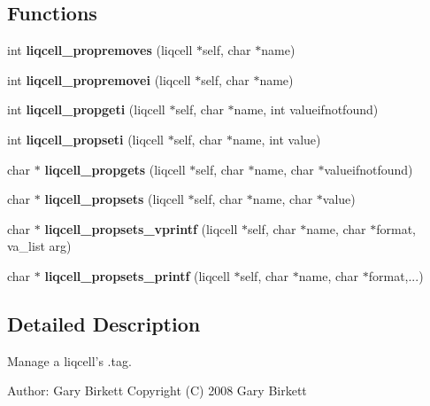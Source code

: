 \subsection*{Functions}
\begin{CompactItemize}
\item 
int \textbf{liqcell\_\-propremoves} (liqcell $\ast$self, char $\ast$name)\label{d7/db4/liqcell__prop_8c_f2fcef990511d5410f99d33e3e490837}

\item 
int \textbf{liqcell\_\-propremovei} (liqcell $\ast$self, char $\ast$name)\label{d7/db4/liqcell__prop_8c_3e300caf2db00ee98fd4663a93073d23}

\item 
int \textbf{liqcell\_\-propgeti} (liqcell $\ast$self, char $\ast$name, int valueifnotfound)\label{d7/db4/liqcell__prop_8c_d95b04d386b49c246a1f95105092cbd1}

\item 
int {\bf liqcell\_\-propseti} (liqcell $\ast$self, char $\ast$name, int value)
\item 
char $\ast$ \textbf{liqcell\_\-propgets} (liqcell $\ast$self, char $\ast$name, char $\ast$valueifnotfound)\label{d7/db4/liqcell__prop_8c_ab87e63e7cf949c5cb3e5f565cd7c45a}

\item 
char $\ast$ \textbf{liqcell\_\-propsets} (liqcell $\ast$self, char $\ast$name, char $\ast$value)\label{d7/db4/liqcell__prop_8c_0bc940f551da2fc15934dbb219afd405}

\item 
char $\ast$ \textbf{liqcell\_\-propsets\_\-vprintf} (liqcell $\ast$self, char $\ast$name, char $\ast$format, va\_\-list arg)\label{d7/db4/liqcell__prop_8c_dfcb286b306ea122d2723c7826b5e4ec}

\item 
char $\ast$ \textbf{liqcell\_\-propsets\_\-printf} (liqcell $\ast$self, char $\ast$name, char $\ast$format,...)\label{d7/db4/liqcell__prop_8c_fc25d6de82a049b5387947d89ef0f937}

\end{CompactItemize}


\label{_details}
\subsection{Detailed Description}
Manage a liqcell's .tag. 

\begin{Desc}
\item[Author:]Gary Birkett Copyright (C) 2008 Gary Birkett\end{Desc}
